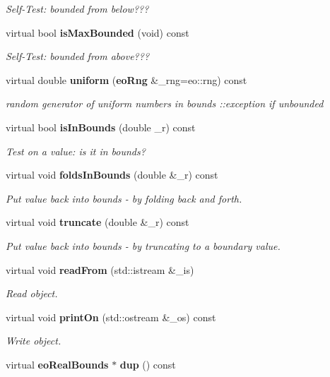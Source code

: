 \begin{CompactItemize}
\begin{CompactList}\small\item\em Self-Test: bounded from below??? \item\end{CompactList}\item 
virtual bool {\bf is\-Max\-Bounded} (void) const \label{classeo_real_interval_a8}

\begin{CompactList}\small\item\em Self-Test: bounded from above??? \item\end{CompactList}\item 
virtual double {\bf uniform} ({\bf eo\-Rng} \&\_\-rng=eo::rng) const \label{classeo_real_interval_a9}

\begin{CompactList}\small\item\em random generator of uniform numbers in bounds ::exception if unbounded \item\end{CompactList}\item 
virtual bool {\bf is\-In\-Bounds} (double \_\-r) const \label{classeo_real_interval_a10}

\begin{CompactList}\small\item\em Test on a value: is it in bounds? \item\end{CompactList}\item 
virtual void {\bf folds\-In\-Bounds} (double \&\_\-r) const \label{classeo_real_interval_a11}

\begin{CompactList}\small\item\em Put value back into bounds - by folding back and forth. \item\end{CompactList}\item 
virtual void {\bf truncate} (double \&\_\-r) const \label{classeo_real_interval_a12}

\begin{CompactList}\small\item\em Put value back into bounds - by truncating to a boundary value. \item\end{CompactList}\item 
virtual void {\bf read\-From} (std::istream \&\_\-is)
\begin{CompactList}\small\item\em Read object. \item\end{CompactList}\item 
virtual void {\bf print\-On} (std::ostream \&\_\-os) const 
\begin{CompactList}\small\item\em Write object. \item\end{CompactList}\item 
virtual {\bf eo\-Real\-Bounds} $\ast$ {\bf dup} () const \label{classeo_real_interval_a15}


\end{CompactItemize}
